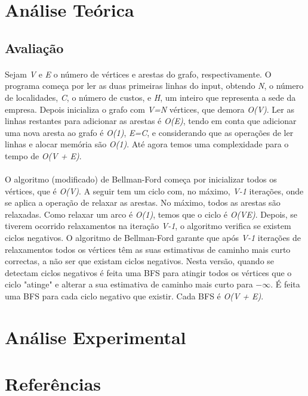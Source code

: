 \documentclass[12pt, a4paper]{article}
\begin{document}
\section{Análise Teórica}
\subsection{Avaliação}
\paragraph{}
Sejam \textit{V} e \textit{E} o número de vértices e arestas do grafo,
respectivamente.  O programa começa por ler as duas primeiras linhas do input,
obtendo \textit{N}, o número de localidades, \textit{C}, o número de custos, e
\textit{H}, um inteiro que representa a sede da empresa. Depois inicializa o
grafo com \textit{V=N} vértices, que demora \textit{O(V)}. Ler as linhas
restantes para adicionar as arestas é \textit{O(E)}, tendo em conta que
adicionar uma nova aresta ao grafo é \textit{O(1)}, \textit{E=C}, e considerando
que as operações de ler linhas e alocar memória são \textit{O(1)}. Até agora
temos uma complexidade para o tempo de \textit{O(V + E)}.

\paragraph{}
O algoritmo (modificado) de Bellman-Ford começa por inicializar todos os
vértices, que é \textit{O(V)}. A seguir tem um ciclo com, no máximo,
\textit{V-1} iterações, onde se aplica a operação de relaxar as arestas. No
máximo, todos as arestas são relaxadas. Como relaxar um arco é \textit{O(1)},
temos que o ciclo é \textit{O(VE)}. Depois, se tiverem ocorrido relaxamentos na
iteração \textit{V-1}, o algoritmo verifica se existem ciclos negativos. O
algoritmo de Bellman-Ford garante que após \textit{V-1} iterações de
relaxamentos todos os vértices têm as suas estimativas de caminho mais curto
correctas, a não ser que existam ciclos negativos. Nesta versão, quando se
detectam ciclos negativos é feita uma BFS para atingir todos os vértices que o
ciclo "atinge" e alterar a sua estimativa de caminho mais curto para
$-\infty$. É feita uma BFS para cada ciclo negativo que existir. Cada BFS é
\textit{O(V + E)}.


\section{Análise Experimental}
\paragraph{}

\section{Referências}
\paragraph{}
\end{document}
